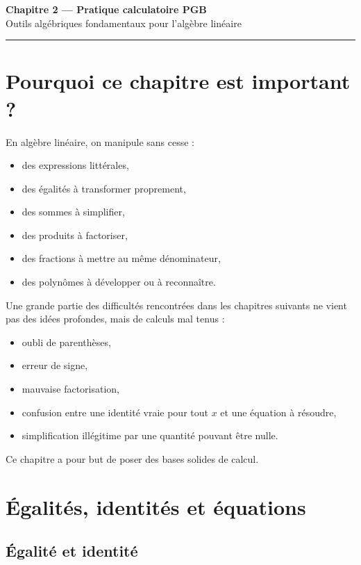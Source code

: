 \documentclass[11pt,a4paper]{article}
\theoremstyle{remark}
\begin{document}
\begin{center}
    {\LARGE \textbf{Chapitre 2 --- Pratique calculatoire PGB}}\\[0.5em]
    {\large Outils algébriques fondamentaux pour l’algèbre linéaire}
\end{center}

\hrule
\vspace{1em}

\tableofcontents

\newpage

\section{Pourquoi ce chapitre est important ?}

En algèbre linéaire, on manipule sans cesse :
\begin{itemize}
    \item des expressions littérales,
    \item des égalités à transformer proprement,
    \item des sommes à simplifier,
    \item des produits à factoriser,
    \item des fractions à mettre au même dénominateur,
    \item des polynômes à développer ou à reconnaître.
\end{itemize}

Une grande partie des difficultés rencontrées dans les chapitres suivants ne vient pas des idées profondes, mais de calculs mal tenus :
\begin{itemize}
    \item oubli de parenthèses,
    \item erreur de signe,
    \item mauvaise factorisation,
    \item confusion entre une identité vraie pour tout \(x\) et une équation à résoudre,
    \item simplification illégitime par une quantité pouvant être nulle.
\end{itemize}

Ce chapitre a pour but de poser des bases solides de calcul.

\section{Égalités, identités et équations}

\subsection{Égalité et identité}
\end{document}
